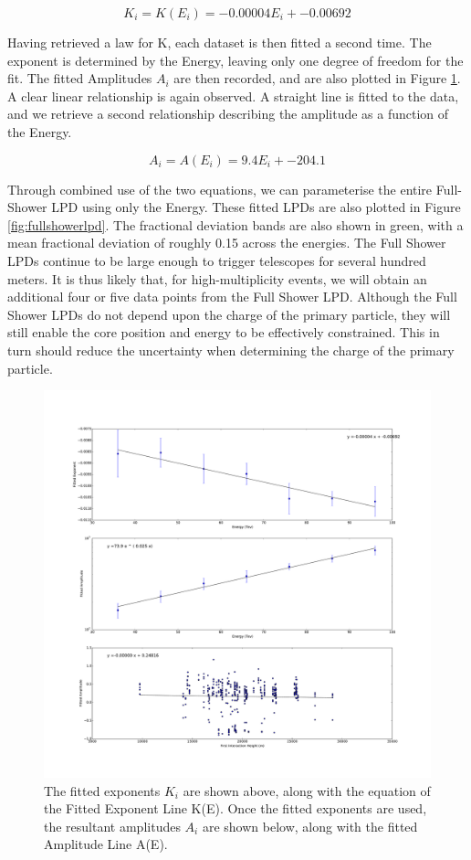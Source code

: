 \documentclass{article}
\begin{document}
\[ K_{i} = K(E_{i}) = -0.00004 E_{i} + -0.00692 \]

Having retrieved a law for K, each dataset is then fitted a second time. The exponent is determined by the Energy, leaving only one degree of freedom for the fit. The fitted Amplitudes $A_{i}$ are then recorded, and are also plotted in Figure \ref{fig:powerlawlpd}. A clear linear relationship is again observed. A straight line is fitted to the data, and we retrieve a second relationship describing the amplitude as a function of the Energy.

\[ A_{i} = A(E_{i}) = 9.4 E_{i} + -204.1 \]

Through combined use of the two equations, we can parameterise the entire Full-Shower LPD using only the Energy. These fitted LPDs are also plotted in Figure \ref{fig:fullshowerlpd}. The fractional deviation bands are also shown in green, with a mean fractional deviation of roughly 0.15 across the energies. The Full Shower LPDs continue to be large enough to trigger telescopes for several hundred meters. It is thus likely that, for high-multiplicity events, we will obtain an additional four or five data points from the Full Shower LPD. Although the Full Shower LPDs do not depend upon the charge of the primary particle, they will still enable the core position and energy to be effectively constrained. This in turn should reduce the uncertainty when determining the charge of the primary particle. 

\begin{figure}
\begin{center}
\includegraphics[width=\textwidth]{lpdpowerlaw}
\caption{The fitted exponents $K_{i}$ are shown above, along with the equation of the Fitted Exponent Line K(E). Once the fitted exponents are used, the resultant amplitudes $A_{i}$ are shown below, along with the fitted Amplitude Line A(E).}
\label{fig:powerlawlpd}
\end{center}
\end{figure}
\end{document}
